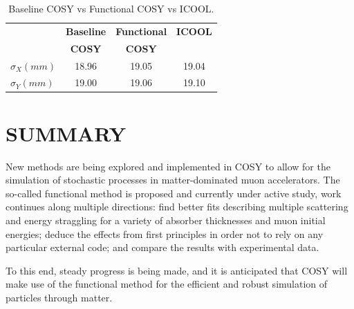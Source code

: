 \documentclass{jacow}
\begin{document}
\begin{table}[hbt]
   \centering
   \caption{Baseline COSY vs Functional COSY vs ICOOL.}
   \begin{tabular}{lccc}
       \toprule
	\textbf{}& \textbf{Baseline} & \textbf{Functional}& \textbf{ICOOL} \\ 
	\textbf{}& \textbf{COSY} & \textbf{COSY}& \textbf{} \\ 
          $ \sigma_X (mm)$&18.96&19.05&19.04\\
	$\sigma_Y (mm)$&19.00&19.06&19.10\\
	\bottomrule
   \end{tabular}
   \label{tab:comparison}
\end{table}

\section{SUMMARY}
New methods are being explored and implemented in COSY to allow for the simulation of stochastic processes in matter-dominated muon accelerators. The so-called functional method is proposed and currently under active study, work continues along multiple directions: find better fits describing multiple scattering and energy straggling for a variety of absorber thicknesses and muon initial energies; deduce the effects from first principles in order not to rely on any particular external code; and compare the results with experimental data.

To this end, steady progress is being made, and it is anticipated that COSY will make use of the functional method for the efficient and robust simulation of particles through matter.
\end{document}
